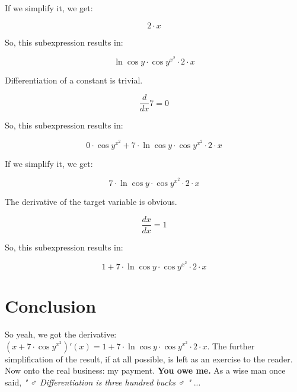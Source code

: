 \documentclass[12pt]{article}
\begin{document}
If we simplify it, we get:

$$  2  \cdot  x  $$

So, this subexpression results in:

$$ \ln \cos  y  \cdot \cos  y ^{ x ^{ 2 }} \cdot  2  \cdot  x  $$

Differentiation of a constant is trivial.

$$ \frac{d}{dx} 7 = 0 $$

So, this subexpression results in:

$$  0  \cdot \cos  y ^{ x ^{ 2 }} +  7  \cdot \ln \cos  y  \cdot \cos  y ^{ x ^{ 2 }} \cdot  2  \cdot  x  $$

If we simplify it, we get:

$$  7  \cdot \ln \cos  y  \cdot \cos  y ^{ x ^{ 2 }} \cdot  2  \cdot  x  $$

The derivative of the target variable is obvious.

$$ \frac{dx}{dx} = 1 $$

So, this subexpression results in:

$$  1  +  7  \cdot \ln \cos  y  \cdot \cos  y ^{ x ^{ 2 }} \cdot  2  \cdot  x  $$

\section{\Large{Conclusion}}
So yeah, we got the derivative: 
$ \left( x  +  7  \cdot \cos  y ^{ x ^{ 2 }}\right)'\left(x\right) =  1  +  7  \cdot \ln \cos  y  \cdot \cos  y ^{ x ^{ 2 }} \cdot  2  \cdot  x  $. 
The further simplification of the result, if at all possible, is left as an exercise to the reader.
Now onto the real business: my payment. \textbf{You owe me.}
As a wise man once said, \textit{" ♂ Differentiation is three hundred bucks ♂ "} ...
\end{document}
